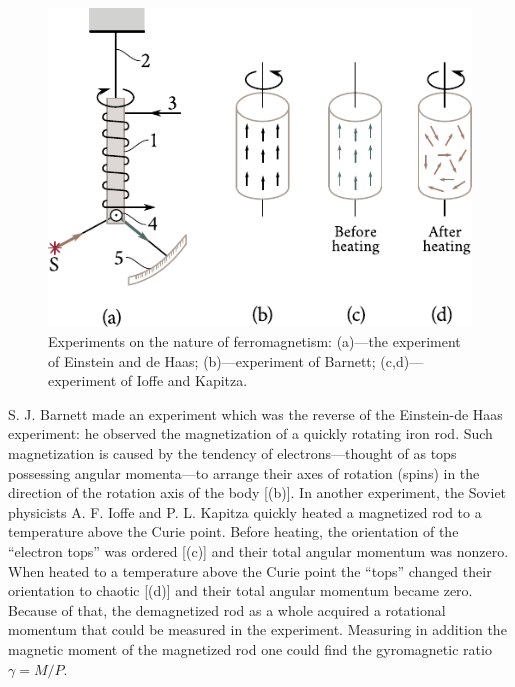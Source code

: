 \begin{figure}[t]
	\begin{center}
		\includegraphics[scale=1]{figures/ch_07/fig_7_14.pdf}
		\caption[]{Experiments on the nature of ferromagnetism: (a)---the experiment of Einstein and de Haas; (b)---experiment of Barnett; (c,d)---experiment of Ioffe and Kapitza.}
		\label{fig:7_14}
	\end{center}
	\vspace{-0.8cm}
\end{figure}

S. J. Barnett made an experiment which was the reverse of the Einstein-de Haas experiment: he observed the magnetization of a quickly rotating iron rod. Such magnetization is caused by the tendency of electrons---thought of as tops possessing angular momenta---to arrange their axes of rotation (spins) in the direction of the rotation axis of the body [(b)]. In another experiment, the Soviet physicists A. F. Ioffe and P. L. Kapitza quickly heated a magnetized rod to a temperature above the Curie point. Before heating, the orientation of the ``electron tops'' was ordered [(c)] and their total angular momentum was nonzero. When heated to a temperature above the Curie point the ``tops'' changed their orientation to chaotic [(d)] and their total angular momentum became zero. Because of that, the demagnetized rod as a whole acquired a rotational momentum that could be measured in the experiment. Measuring in addition the magnetic moment of the magnetized rod one could find the gyromagnetic ratio $\gamma=M/P$.

